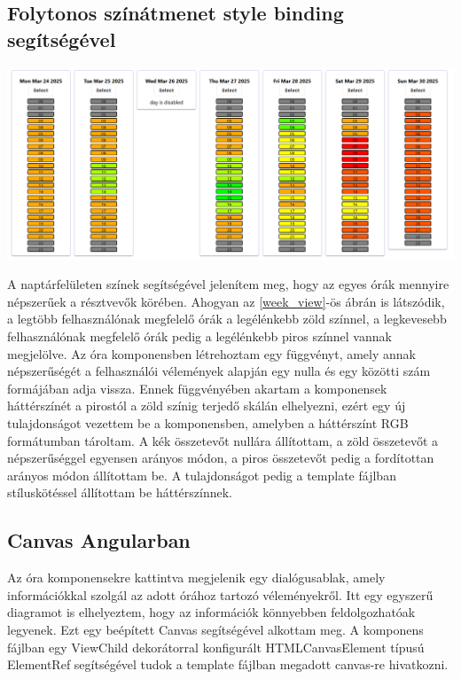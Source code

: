 \documentclass[a4paper,12pt]{report}
\theoremstyle{definition}
\theoremstyle{remark}
\begin{document}
	\subsection{Folytonos színátmenet style binding segítségével}

\begin{center}
\includegraphics[width=160mm]{week_view}
\captionsetup{width=0.8\linewidth}
\label{week_view}
\end{center}

A naptárfelületen színek segítségével jelenítem meg, hogy az egyes órák mennyire népszerűek a résztvevők körében. Ahogyan az \ref{week_view}-ös ábrán is látszódik, a legtöbb felhasználónak megfelelő órák a legélénkebb zöld színnel, a legkevesebb felhasználónak megfelelő órák pedig a legélénkebb piros színnel vannak megjelölve. Az óra komponensben létrehoztam egy függvényt, amely annak népszerűségét a felhasználói vélemények alapján egy nulla és egy közötti szám formájában adja vissza. Ennek függvényében akartam a komponensek háttérszínét a pirostól a zöld színig terjedő skálán elhelyezni, ezért egy új tulajdonságot vezettem be a komponensben, amelyben a háttérszínt RGB formátumban tároltam. A kék összetevőt nullára állítottam, a zöld összetevőt a népszerűséggel egyensen arányos módon, a piros összetevőt pedig a fordítottan arányos módon állítottam be. A tulajdonságot pedig a template fájlban stíluskötéssel állítottam be háttérszínnek.

	\subsection{Canvas Angularban}

Az óra komponensekre kattintva megjelenik egy dialógusablak, amely információkkal szolgál az adott órához tartozó véleményekről. Itt egy egyszerű diagramot is elhelyeztem, hogy az információk könnyebben feldolgozhatóak legyenek. Ezt egy beépített Canvas segítségével alkottam meg. A komponens fájlban egy ViewChild dekorátorral konfigurált HTMLCanvasElement típusú ElementRef segítségével tudok a template fájlban megadott canvas-re hivatkozni.
\end{document}
